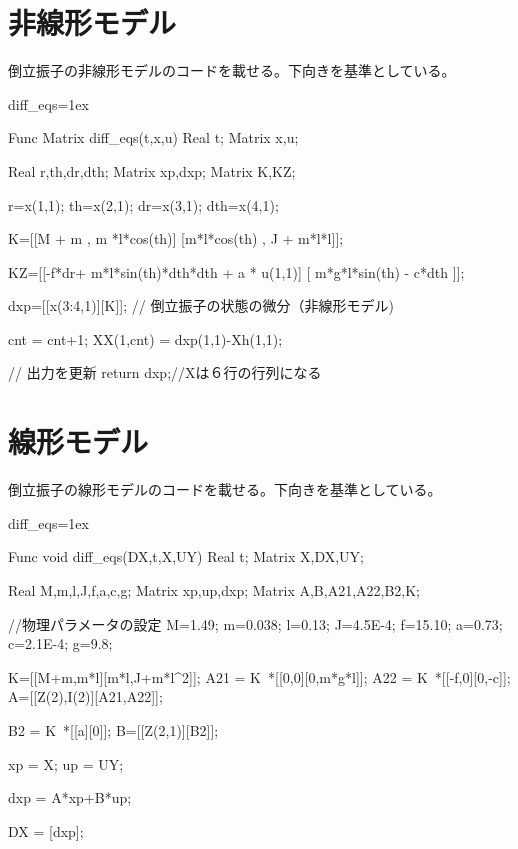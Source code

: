 \section{非線形モデル}
	倒立振子の非線形モデルのコードを載せる。下向きを基準としている。
	\begin{breakitembox}[l]{diff\_eqs}\baselineskip=1ex
		\begin{verbatimtab}[4]
Func Matrix diff_eqs(t,x,u)
Real t;
Matrix x,u;
{
	Real r,th,dr,dth;
	Matrix xp,dxp;
	Matrix K,KZ;

	r=x(1,1);
	th=x(2,1);
	dr=x(3,1);
	dth=x(4,1);

	K=[[M + m , m *l*cos(th)]
	   [m*l*cos(th) , J + m*l*l]];

	KZ=[[-f*dr+ m*l*sin(th)*dth*dth + a * u(1,1)]
		[ m*g*l*sin(th) - c*dth ]];
	
	dxp=[[x(3:4,1)][K\KZ]]; // 倒立振子の状態の微分（非線形モデル)

	cnt = cnt+1;
	XX(1,cnt) = dxp(1,1)-Xh(1,1);
	
	// 出力を更新
	return dxp;//Xは６行の行列になる
}
		\end{verbatimtab}
	\end{breakitembox}
\section{線形モデル}
	倒立振子の線形モデルのコードを載せる。下向きを基準としている。
	\begin{breakitembox}[l]{diff\_eqs}\baselineskip=1ex
		\begin{verbatimtab}[4]
Func void diff_eqs(DX,t,X,UY)
Real t;
Matrix X,DX,UY;
{
	Real M,m,l,J,f,a,c,g;
	Matrix xp,up,dxp;
	Matrix A,B,A21,A22,B2,K;
	
	//物理パラメータの設定
	M=1.49;   m=0.038; l=0.13;
	J=4.5E-4; f=15.10; a=0.73;
	c=2.1E-4; g=9.8;
	
	K=[[M+m,m*l][m*l,J+m*l^2]];
	A21 = K~*[[0,0][0,m*g*l]];
	A22 = K~*[[-f,0][0,-c]];
	A=[[Z(2),I(2)][A21,A22]];
	
	B2 = K~*[[a][0]];
	B=[[Z(2,1)][B2]];
	
	xp = X;
	up = UY;
	
	dxp = A*xp+B*up;
	
	DX = [dxp];

}
		\end{verbatimtab}
	\end{breakitembox}
